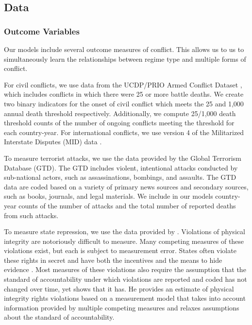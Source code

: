 \documentclass[titlepage, onecolumn,12pt]{article}
\begin{document}
\subsection{Data}

\subsubsection{Outcome Variables}

Our models include several outcome measures of conflict. This allows us to us to simultaneously learn the relationships between regime type and multiple forms of conflict.

For civil conflicts, we use data from the UCDP/PRIO Armed Conflict Dataset \citep{gleditsch2002armed}, which includes conflicts in which there were 25 or more battle deaths. We create two binary indicators for the onset of civil conflict which meets the 25 and 1,000 annual death threshold respectively. Additionally, we compute 25/1,000 death threshold counts of the number of ongoing conflicts meeting the threshold for each country-year. For international conflicts, we use version 4 of the Militarized Interstate Disputes (MID) data \citep{palmer2015mid4}.

To measure terrorist attacks, we use the data provided by the Global Terrorism Database (GTD). The GTD includes violent, intentional attacks conducted by sub-national actors, such as assassinations, bombings, and assaults. The GTD data are coded based on a variety of primary news sources and secondary sources, such as books, journals, and legal materials. We include in our models country-year counts of the number of attacks and the total number of reported deaths from such attacks.

To measure state repression, we use the data provided by \citet{fariss2014respect}. Violations of physical integrity are notoriously difficult to measure. Many competing measures of these violations exist, but each is subject to measurement error. States often violate these rights in secret and have both the incentives and the means to hide evidence \citep{Lupu2013a}. Most measures of these violations also require the assumption that the standard of accountability under which violations are reported and coded has not changed over time, yet \citet{fariss2014respect} shows that it has. He provides an estimate of physical integrity rights violations based on a measurement model that takes into account information provided by multiple competing measures and relaxes assumptions about the standard of accountability.
\end{document}
